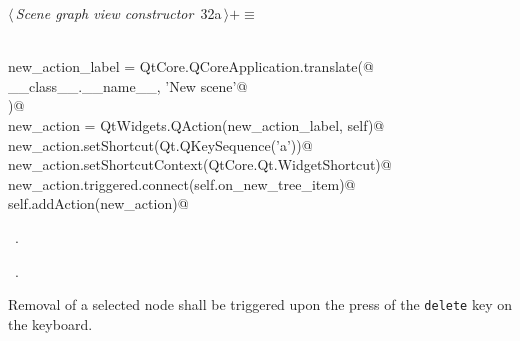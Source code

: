\documentclass[
    a4paper,      %
    10pt,         %
    openright,    %
    notitlepage,  %
    parskip=half, %
]{scrreprt}       %
\theoremstyle{definition}                    %
\begin{document}
\begin{flushleft} \small
\begin{minipage}{\linewidth}\label{scrap34}\raggedright\small
{} $\langle\,${\itshape Scene graph view constructor}\nobreak\ {\footnotesize {32a}}$\,\rangle+\equiv$
\vspace{-1ex}
\begin{list}{}{} \item
\mbox{}\lstinline@@\\
\mbox{}\lstinline@    new_action_label = QtCore.QCoreApplication.translate(@\\
\mbox{}\lstinline@        __class__.__name__, 'New scene'@\\
\mbox{}\lstinline@    )@\\
\mbox{}\lstinline@    new_action = QtWidgets.QAction(new_action_label, self)@\\
\mbox{}\lstinline@    new_action.setShortcut(Qt.QKeySequence('a'))@\\
\mbox{}\lstinline@    new_action.setShortcutContext(QtCore.Qt.WidgetShortcut)@\\
\mbox{}\lstinline@    new_action.triggered.connect(self.on_new_tree_item)@\\
\mbox{}\lstinline@    self.addAction(new_action)@\\
\mbox{}\lstinline@@{\NWsep}
\end{list}
\vspace{-1.5ex}
\footnotesize
\begin{list}{}{\setlength{\itemsep}{-\parsep}\setlength{\itemindent}{-\leftmargin}}
\item \NWtxtMacroDefBy\ .
\item \NWtxtMacroRefIn\ .

\item{}
\end{list}
\end{minipage}\vspace{4ex}
\end{flushleft}
Removal of a selected node shall be triggered upon the press of the
\verb=delete= key on the keyboard.
\end{document}
